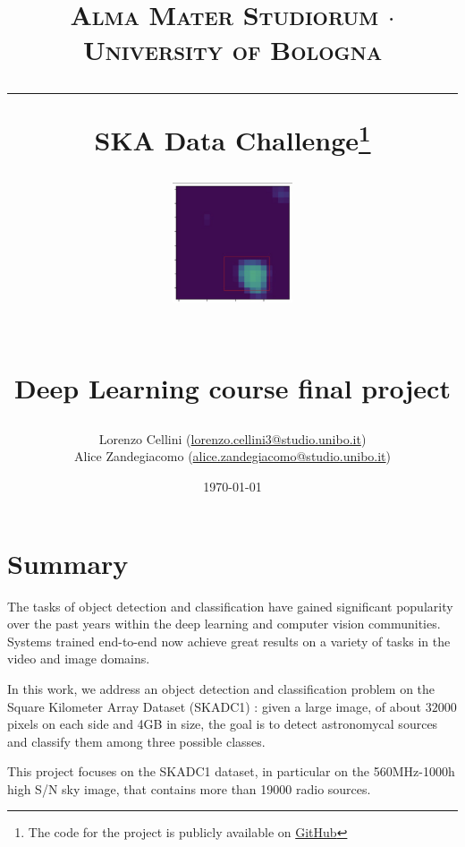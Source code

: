 \documentclass[a4paper,10pt]{report}
\begin{document}
\frenchspacing

\title{
  {{\large{\textsc{Alma Mater Studiorum $\cdot$ University of Bologna}}}}
  \rule{\textwidth}{0.4pt}\vspace{3mm}
  \textbf{SKA Data Challenge\footnote{The code for the project is publicly available on \href{https://github.com/Lorenz92/SKADC1}{GitHub}}}
  \begin{figure}[!htb]
    \centering
    \includegraphics[width = 100pt]{nice-detection.png}
  \end{figure} \\
  Deep Learning course final project
}

\author{Lorenzo Cellini (\href{mailto:lorenzo.cellini3@studio.unibo.it}{lorenzo.cellini3@studio.unibo.it}) \\ Alice Zandegiacomo (\href{mailto:alice.zandegiacomo@studio.unibo.it}{alice.zandegiacomo@studio.unibo.it})}
\date{\today}
\maketitle
\newpage
\tableofcontents
\setcounter{tocdepth}{1}
\newpage


\chapter{Summary}\label{chap:introduction}

The tasks of object detection and classification have gained significant popularity over the past years within the deep learning and computer vision communities. Systems trained end-to-end now achieve great results on a variety of tasks in the video and image domains.

In this work, we address an object detection and classification problem on the Square Kilometer Array Dataset (SKADC1) \cite{ska-site}: given a large image, of about $32000$ pixels on each side and 4GB in size, the goal is to detect astronomycal sources and classify them among three possible classes.

This project focuses on the SKADC1 dataset, in particular on the 560MHz-1000h high S/N sky image, that contains more than \num{19000} radio sources.
\end{document}
